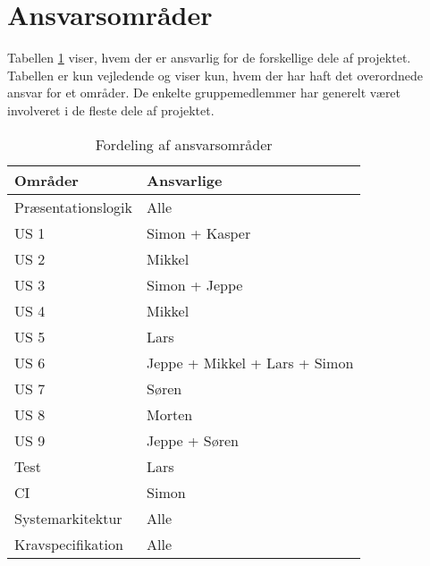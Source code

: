 \section{Ansvarsområder}
Tabellen \ref{fig:Ansvarstabel} viser, hvem der er ansvarlig for de forskellige dele af projektet. Tabellen er kun vejledende og viser kun, hvem der har haft det overordnede ansvar for et områder. De enkelte gruppemedlemmer har generelt været involveret i de fleste dele af projektet.  
\begin{table}[H]
	\begin{tabular}{ | l | p{5cm} |}
		\hline
		\textbf{Områder}  & \textbf{Ansvarlige} \\ \hline
		Præsentationslogik & Alle \\ \hline
		US 1 & Simon + Kasper \\ \hline
		US 2 & Mikkel \\ \hline
		US 3 & Simon + Jeppe \\ \hline
		US 4 & Mikkel \\ \hline
		US 5 & Lars \\ \hline
		US 6 & Jeppe + Mikkel + Lars + Simon \\ \hline
		US 7 & Søren \\ \hline	
		US 8 & Morten\\ \hline	
		US 9 & Jeppe + Søren\\ \hline	
		Test & Lars  \\ \hline
		CI & Simon \\ \hline
		Systemarkitektur & Alle \\ \hline	
		Kravspecifikation & Alle \\ \hline	
	\end{tabular}
	\caption{Fordeling af ansvarsområder}
	\label{fig:Ansvarstabel}
\end{table}